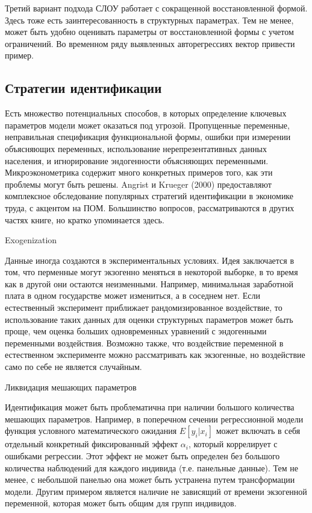 Третий вариант подхода СЛОУ работает с сокращенной восстановленной формой. Здесь тоже есть заинтересованность в структурных параметрах. Тем не менее, может быть удобно оценивать параметры от восстановленной формы с учетом ограничений. Во временном ряду выявленных авторегрессиях вектор привести пример.


\subsection{Стратегии идентификации}


Есть множество потенциальных способов, в которых определение ключевых параметров модели может оказаться под угрозой. Пропущенные переменные, неправильная спецификация функциональной формы, ошибки при измерении объясняющих переменных, использование нерепрезентативных данных населения, и игнорирование эндогенности объясняющих переменными. Микроэконометрика содержит много конкретных примеров того, как эти проблемы могут быть решены. Angrist и Krueger (2000) предоставляют комплексное обследование популярных стратегий идентификации в экономике труда, с акцентом на ПОМ. Большинство вопросов, рассматриваются в других частях книге, но кратко упоминается здесь.


\begin{center}
Exogenization
\end{center}


Данные иногда создаются в экспериментальных условиях. Идея заключается в том, что перменные могут экзогенно меняться  в некоторой выборке, в то время как в другой они остаются неизменными. Например,  минимальная заработной плата в одном государстве может измениться, а в соседнем нет. Если естественный эксперимент приближает рандомизированное воздействие, то использование таких данных для оценки структурных параметров может быть проще, чем оценка больших одновременных уравнений с эндогенными переменными воздействия. Возможно также, что воздействие переменной в естественном эксперименте можно рассматривать как экзогенные, но воздействие само по себе не является случайным.


\begin{center}
Ликвидация мешающих параметров
\end{center}


Идентификация может быть проблематична при наличии большого количества мешающих параметров. Например, в поперечном сечении регрессионной модели функция условного математического ожидания $E[y_{i}|x_{i}]$ может включать в себя отдельный конкретный фиксированный эффект $\alpha_{i}$, который коррелирует с ошибками регрессии. Этот эффект не может быть определен без большого количества наблюдений для каждого индивида (т.е. панельные данные). Тем не менее, с небольшой панелью она может быть устранена путем трансформации модели. Другим примером является наличие не зависящий от времени экзогенной переменной, которая может быть общим для групп индивидов.


